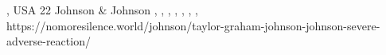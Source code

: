           {
            , USA
          }
          {
            22
          }
          {
            Johnson \& Johnson
          }
          {
          }
          {
            ,
            ,
            ,
            ,
            ,
            ,
            ,
          }
          {
            https://nomoresilence.world/johnson/taylor-graham-johnson-johnson-severe-adverse-reaction/
          }

